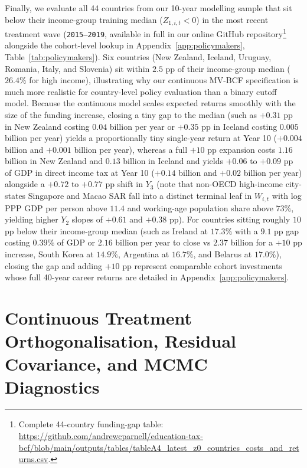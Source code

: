 \documentclass[11pt,a4paper]{article}
\providecommand{\FloatBarrier}{}
\begin{document}
Finally, we evaluate all 44 countries from our 10-year modelling sample that sit below their income-group training median ($Z_{1,i,t} < 0$) in the most recent treatment wave (\texttt{2015--2019}, available in full in our online GitHub repository\footnote{\raggedright Complete 44-country funding-gap table: \url{https://github.com/andrewcparnell/education-tax-bcf/blob/main/outputs/tables/tableA4_latest_z0_countries_costs_and_returns.csv}.} alongside the cohort-level lookup in Appendix~\ref{app:policymakers}, Table~\ref{tab:policymakers}). Six countries (New Zealand, Iceland, Uruguay, Romania, Italy, and Slovenia) sit within $2.5$ pp of their income-group median ($26.4\%$ for high income), illustrating why our continuous MV-BCF specification is much more realistic for country-level policy evaluation than a binary cutoff model. Because the continuous model scales expected returns smoothly with the size of the funding increase, closing a tiny gap to the median (such as $+0.31$ pp in New Zealand costing \texteuro$0.04$ billion per year or $+0.35$ pp in Iceland costing \texteuro$0.005$ billion per year) yields a proportionally tiny single-year return at Year 10 (\texteuro$+0.004$ billion and \texteuro$+0.001$ billion per year), whereas a full $+10$ pp expansion costs \texteuro$1.16$ billion in New Zealand and \texteuro$0.13$ billion in Iceland and yields $+0.06$ to $+0.09$ pp of GDP in direct income tax at Year 10 (\texteuro$+0.14$ billion and \texteuro$+0.02$ billion per year) alongside a $+0.72$ to $+0.77$ pp shift in $Y_3$ (note that non-OECD high-income city-states Singapore and Macao SAR fall into a distinct terminal leaf in $W_{i,t}$ with log PPP GDP per person above $11.4$ and working-age population share above $73\%$, yielding higher $Y_2$ slopes of $+0.61$ and $+0.38$ pp). For countries sitting roughly $10$ pp below their income-group median (such as Ireland at $17.3\%$ with a $9.1$ pp gap costing $0.39\%$ of GDP or \texteuro$2.16$ billion per year to close vs \texteuro$2.37$ billion for a $+10$ pp increase, South Korea at $14.9\%$, Argentina at $16.7\%$, and Belarus at $17.0\%$), closing the gap and adding $+10$ pp represent comparable cohort investments whose full 40-year career returns are detailed in Appendix~\ref{app:policymakers}.
\FloatBarrier

\section{Continuous Treatment Orthogonalisation, Residual Covariance, and MCMC Diagnostics}
\label{app:diagnostics}
\end{document}
